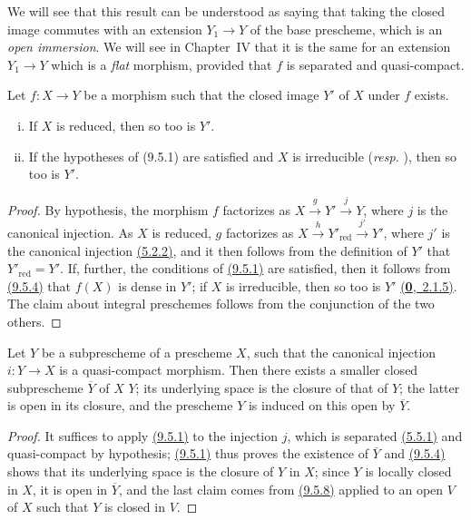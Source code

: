 We will see that this result can be understood as saying that taking the closed image commutes with an extension $Y_1\to Y$ of the base prescheme, which is an {\it open immersion}.
We will see in Chapter~IV that it is the same for an extension $Y_1\to Y$ which is a {\it flat} morphism, provided that $f$ is separated and quasi-compact.

\begin{prop}[9.5.9]
\label{prop-1.9.5.9}
Let $f\colon X\to Y$ be a morphism such that the closed image $Y'$ of $X$ under $f$ exists.
\begin{enumerate}[(i)]
    \item If $X$ is reduced, then so too is $Y'$.
    \item If the hypotheses of (9.5.1) are satisfied and $X$ is irreducible (\emph{resp.} ), then so too is $Y'$.
\end{enumerate}
\end{prop}

\begin{proof}
\label{proof-prop-1.9.5.9}
By hypothesis, the morphism $f$ factorizes as $X\xrightarrow{g}Y'\xrightarrow{j}Y$, where $j$ is the canonical injection.
As $X$ is reduced, $g$ factorizes as $X\xrightarrow{h}Y'_\mathrm{red}\xrightarrow{j'}Y'$, where $j'$ is the canonical injection \hyperref[prop-1.5.2.2]{(5.2.2)}, and it then follows from the definition of $Y'$ that $Y'_\mathrm{red}=Y'$.
If, further, the conditions of \hyperref[prop-1.5.9.1]{(9.5.1)} are satisfied, then it follows from \hyperref[prop-1.9.5.4]{(9.5.4)} that $f(X)$ is dense in $Y'$; if $X$ is irreducible, then so too is $Y'$ \hyperref[env-0.2.1.5]{(\textbf{0},~2.1.5)}.
The claim about integral preschemes follows from the conjunction of the two others.
\end{proof}

\begin{prop}[9.5.10]
\label{prop-1.9.5.10}
Let $Y$ be a subprescheme of a prescheme $X$, such that the canonical injection $i\colon Y\to X$ is a quasi-compact morphism.
Then there exists a smaller closed subprescheme $\overline{Y}$ of $X$  $Y$; its underlying space is the closure of that of $Y$; the latter is open in its closure, and the prescheme $Y$ is induced on this open by $\overline{Y}$.
\end{prop}

\begin{proof}
\label{proof-prop-1.9.5.10}
It suffices to apply \hyperref[prop-1.5.9.1]{(9.5.1)} to the injection $j$, which is separated \hyperref[prop-1.5.5.1]{(5.5.1)} and quasi-compact by hypothesis; \hyperref[prop-1.5.9.1]{(9.5.1)} thus proves the existence of $\overline{Y}$ and \hyperref[prop-1.5.9.4]{(9.5.4)} shows that its underlying space is the closure of $Y$ in $X$; since $Y$ is locally closed in $X$, it is open in $\overline{Y}$, and the last claim comes from \hyperref[prop-1.5.9.8]{(9.5.8)} applied to an open $V$ of $X$ such that $Y$ is closed in $V$.
\end{proof}

